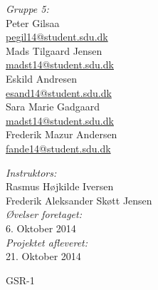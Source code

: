 \begin{titlepage}
\begin{center}
\begin{minipage}{0.50\textwidth}
\begin{flushleft}\large
\emph{Gruppe 5:}\\
Peter Gilsaa \\
\href{mailto:pegil14@student.sdu.dk}{\color{sdu_blue}pegil14@student.sdu.dk}\\
Mads Tilgaard Jensen\\
\href{mailto:madst14@student.sdu.dk}{\color{sdu_blue}madst14@student.sdu.dk}\\
Eskild Andresen\\
\href{mailto:esand14@student.sdu.dk}{\color{sdu_blue}esand14@student.sdu.dk}\\
Sara Marie Gadgaard\\
\href{mailto:14@student.sdu.dk}{\color{sdu_blue}madst14@student.sdu.dk}\\
Frederik Mazur Andersen\\
\href{mailto:fande14@student.sdu.dk}{\color{sdu_blue}fande14@student.sdu.dk}\\
\end{flushleft}
\end{minipage}
\begin{minipage}[c][2cm]{0.45\textwidth}
\begin{flushright} \large
\vspace{2cm}
\emph{Instruktors:} \\
Rasmus Højkilde Iversen  \\
Frederik Aleksander Skøtt Jensen \\
\vspace{2cm}
\emph{Øvelser foretaget:} \\
6. Oktober 2014 \\
\emph{Projektet afleveret:} \\
21. Oktober 2014
\end{flushright}
\end{minipage}

\vfill

{\Large GSR-1}
\end{center}
\end{titlepage}
